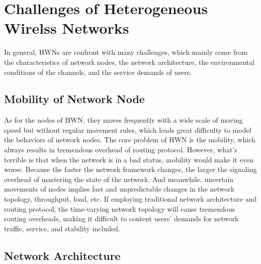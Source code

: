 \documentclass[journal,comsoc]{IEEEtran}
\begin{document}
	\section{Challenges of Heterogeneous Wirelss Networks}
	\label{section: research_challenges}
		In general, HWNs are confront with many challenges, 
		which mainly come from the characteristics of network nodes, the network architecture, 
		the environmental conditions of the channels, and the service demands of users.
	
	\subsection{Mobility of Network Node}
		As for the nodes of HWN,  they moves frequently with a wide scale of moving speed but without regular movement rules, 
		which leads great difficulty to model the behaviors of network nodes.
		The core problem of HWN is the mobility, which always results in tremendous overhead of routing protocol. 
		However, what's terrible is that when the network is in a bad status, mobility would make it even worse. 
		Because the faster the network framework changes, the larger the signaling overhead of mastering the state of the network.
		And meanwhile, uncertain movements of nodes implies fast and unpredictable changes in the network topology, throughput, load, etc. 
		If employing traditional network architecture and routing protocol, the time-varying network topology will cause tremendous routing overheads, 
		making it difficult to content users' demands for network traffic, service, and stability included.
	
	\subsection{Network Architecture}
	
\end{document}
